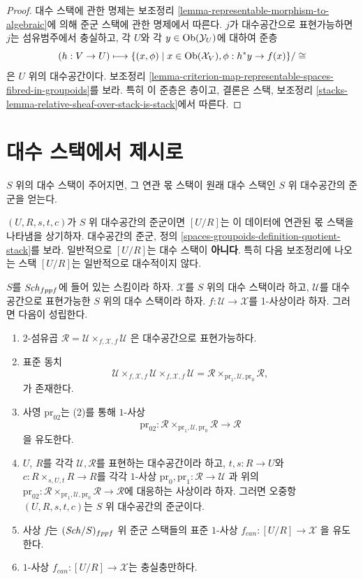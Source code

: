 \begin{proof}
대수 스택에 관한 명제는 보조정리
\ref{lemma-representable-morphism-to-algebraic}에 의해 준군 스택에 관한
명제에서 따른다. $j$가 대수공간으로 표현가능하면 $j$는 섬유범주에서
충실하고, 각 $U$와 각 $y \in \mathop{\mathrm{Ob}}\nolimits(\mathcal{Y}_U)$에 대하여 준층
$$
(h : V \to U)
\longmapsto
\{(x, \phi) \mid x \in \mathop{\mathrm{Ob}}\nolimits(\mathcal{X}_V), \phi : h^*y \to f(x)\}/\cong
$$
은 $U$ 위의 대수공간이다. 보조정리
\ref{lemma-criterion-map-representable-spaces-fibred-in-groupoids}를 보라.
특히 이 준층은 층이고, 결론은 스택, 보조정리
\ref{stacks-lemma-relative-sheaf-over-stack-is-stack}에서 따른다.
\end{proof}



\section{대수 스택에서 제시로}
\label{section-stack-to-presentation}

\noindent
$S$ 위의 대수 스택이 주어지면, 그 연관 몫 스택이 원래 대수 스택인
$S$ 위 대수공간의 준군을 얻는다.

\medskip\noindent
$(U, R, s, t, c)$가 $S$ 위 대수공간의 준군이면 $[U/R]$는 이 데이터에
연관된 몫 스택을 나타냄을 상기하자. 대수공간의 준군, 정의
\ref{spaces-groupoids-definition-quotient-stack}를 보라. 일반적으로
$[U/R]$는 대수 스택이 {\bf 아니다}. 특히 다음 보조정리에 나오는 스택
$[U/R]$는 일반적으로 대수적이지 않다.

\begin{lemma}
\label{lemma-map-space-into-stack}
$S$를 $\mathit{Sch}_{fppf}$에 들어 있는 스킴이라 하자. $\mathcal{X}$를
$S$ 위의 대수 스택이라 하고, $\mathcal{U}$를 대수공간으로 표현가능한
$S$ 위의 대수 스택이라 하자. $f : \mathcal{U} \to \mathcal{X}$를
1-사상이라 하자. 그러면 다음이 성립한다.
\begin{enumerate}
\item $2$-섬유곱
$\mathcal{R} = \mathcal{U} \times_{f, \mathcal{X}, f} \mathcal{U}$
은 대수공간으로 표현가능하다.
\item 표준 동치
$$
\mathcal{U} \times_{f, \mathcal{X}, f} \mathcal{U}
\times_{f, \mathcal{X}, f} \mathcal{U} =
\mathcal{R} \times_{\text{pr}_1, \mathcal{U}, \text{pr}_0} \mathcal{R},
$$
가 존재한다.
\item 사영 $\text{pr}_{02}$는 (2)를 통해 $1$-사상
$$
\text{pr}_{02} :
\mathcal{R} \times_{\text{pr}_1, \mathcal{U}, \text{pr}_0} \mathcal{R}
\longrightarrow
\mathcal{R}
$$
을 유도한다.
\item $U$, $R$를 각각 $\mathcal{U}, \mathcal{R}$를 표현하는 대수공간이라
하고, $t, s : R \to U$와 $c : R \times_{s, U, t} R \to R$를 각각
$1$-사상
$\text{pr}_0, \text{pr}_1 : \mathcal{R} \to \mathcal{U}$
과 위의
$\text{pr}_{02} :
\mathcal{R} \times_{\text{pr}_1, \mathcal{U}, \text{pr}_0} \mathcal{R} \to
\mathcal{R}$에 대응하는 사상이라 하자. 그러면 오중항
$(U, R, s, t, c)$는 $S$ 위 대수공간의 준군이다.
\item 사상 $f$는 $(\mathit{Sch}/S)_{fppf}$ 위 준군 스택들의 표준 $1$-사상
$f_{can} : [U/R] \to \mathcal{X}$
을 유도한다.
\item $1$-사상 $f_{can} : [U/R] \to \mathcal{X}$는 충실충만하다.
\end{enumerate}
\end{lemma}

